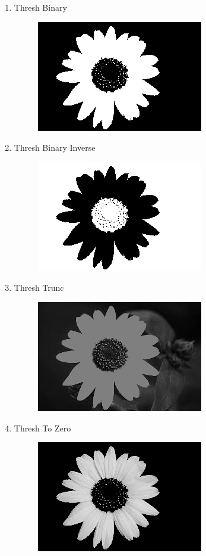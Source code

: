 \documentclass[]{article}
\begin{document}
\begin{enumerate}
\def\labelenumi{\arabic{enumi})}
\item Thresh Binary\\
  \begin{figure}[h]
  	\includegraphics{Threshbinary.jpg}
  \end{figure}
\newpage
\item Thresh Binary Inverse \\
  \begin{figure}[h]
  	\includegraphics{ThreshBinaryInv.jpg}
  \end{figure}
\item Thresh Trunc\\
  \begin{figure}[h]
  	\includegraphics{ThreshTrunc.jpg}
  \end{figure}
\newpage
\item Thresh To Zero\\
  \begin{figure}[h]
  	\includegraphics{ThreshToZero.jpg}

\end{figure}
\end{enumerate}
\end{document}
